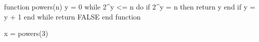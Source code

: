 function powers(n)
  y = 0
  while 2^y <= n do
    if 2^y = n then
      return y
    end if
    y = y + 1
  end while
  return FALSE
end function

x = powers(3)
